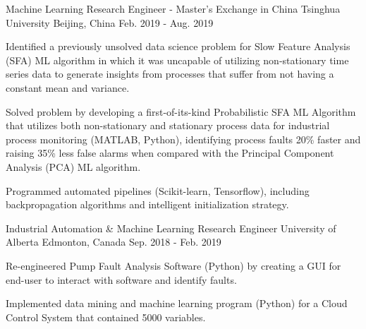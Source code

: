 

\begin{cventries}

  \cventry
    {Machine Learning Research Engineer - Master's Exchange in China} %
    {Tsinghua University} %
    {Beijing, China} %
    {Feb. 2019 - Aug. 2019} %
    {
      \begin{cvitems} %
        \item{Identified a previously unsolved data science problem for Slow Feature Analysis (SFA) ML algorithm in which it was uncapable of utilizing non-stationary time series data to generate insights from processes that suffer from not having a constant mean and variance.}
        \item {Solved problem by developing a first-of-its-kind Probabilistic SFA ML Algorithm that utilizes both non-stationary and stationary process data for industrial process monitoring (MATLAB, Python), identifying process faults 20\% faster and raising 35\% less false alarms when compared with the Principal Component Analysis (PCA) ML algorithm.}
        \item {Programmed automated pipelines (Scikit-learn, Tensorflow), including backpropagation algorithms and intelligent initialization strategy.}
      \end{cvitems}
    }

  \cventry
    {Industrial Automation \& Machine Learning Research Engineer} %
    {University of Alberta} %
    {Edmonton, Canada} %
    {Sep. 2018 - Feb. 2019} %
    {
      \begin{cvitems} %
        \item {Re-engineered Pump Fault Analysis Software (Python) by creating a GUI for end-user to  interact with software and identify faults.}
        \item {Implemented data mining and machine learning program (Python) for a Cloud Control System that contained 5000 variables.}        
      \end{cvitems}
    }


\end{cventries}

